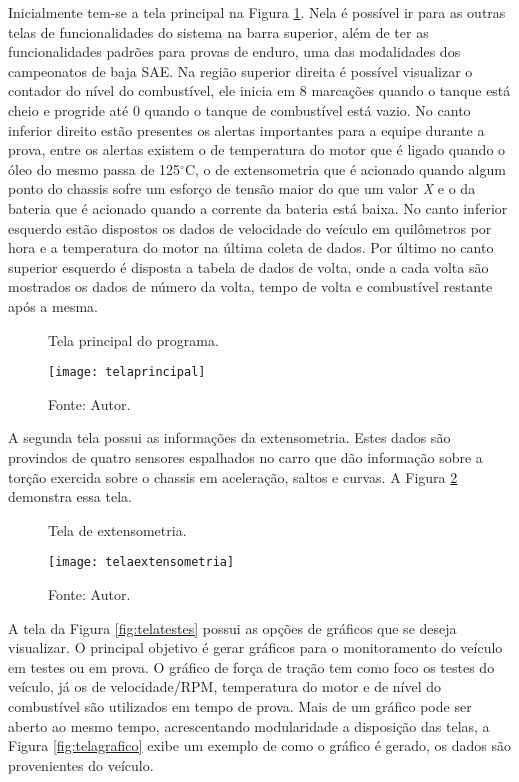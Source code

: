 Inicialmente tem-se a tela principal na Figura \ref{fig:telaprincipal}. Nela é possível ir para as outras telas de funcionalidades do sistema na barra superior, além de ter as funcionalidades padrões para provas de enduro, uma das modalidades dos campeonatos de baja SAE. Na região superior direita é possível visualizar o contador do nível do combustível, ele inicia em 8 marcações quando o tanque está cheio e progride até 0 quando o tanque de combustível está vazio. No canto inferior direito estão presentes os alertas importantes para a equipe durante a prova, entre os alertas existem o de temperatura do motor que é ligado quando o óleo do mesmo passa de 125$^\circ$C, o de extensometria que é acionado quando algum ponto do chassis sofre um esforço de tensão maior do que um valor \textit{X} e o da bateria que é acionado quando a corrente da bateria está baixa. No canto inferior esquerdo estão dispostos os dados de velocidade do veículo em quilômetros por hora e a temperatura do motor na última coleta de dados. Por último no canto superior esquerdo é disposta a tabela de dados de volta, onde a cada volta são mostrados os dados de número da volta, tempo de volta e combustível restante após a mesma. 

\begin{figure}[!htb]
	\centering
		\caption{Tela principal do programa.}
		\texttt{[image: telaprincipal]} 
		\caption*{Fonte: Autor.}
		\label{fig:telaprincipal}
\end{figure}    

A segunda tela possui as informações da extensometria. Estes dados são provindos de quatro sensores espalhados no carro que dão informação sobre a torção exercida sobre o chassis em aceleração, saltos e curvas. A Figura \ref{fig:telaextensometria} demonstra essa tela.

\begin{figure}[!htb]
	\centering
		\caption{Tela de extensometria.}
		\texttt{[image: telaextensometria]} 
		\caption*{Fonte: Autor.}
		\label{fig:telaextensometria}
\end{figure}    

A tela da Figura \ref{fig:telatestes} possui as opções de gráficos que se deseja visualizar. O principal objetivo é gerar gráficos para o monitoramento do veículo em testes ou em prova. O gráfico de força de tração tem como foco os testes do veículo, já os de velocidade/RPM, temperatura do motor e de nível do combustível são utilizados em tempo de prova. Mais de um gráfico pode ser aberto ao mesmo tempo, acrescentando modularidade a disposição das telas, a Figura \ref{fig:telagrafico} exibe um exemplo de como o gráfico é gerado, os dados são provenientes do veículo.

